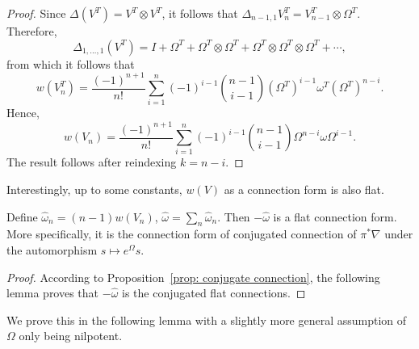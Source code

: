 \begin{proof}
Since $\Delta(V^T)=V^T\otimes V^T$, it follows that $\Delta_{n-1,1} V_n^T=V_{n-1}^T\otimes \Omega^T$. Therefore,
\begin{equation}
    \Delta_{1,\dots,1}(V^T)=I+\Omega^T+\Omega^T\otimes\Omega^T+\Omega^T\otimes\Omega^T\otimes\Omega^T+\cdots,
\end{equation}
from which it follows that
\begin{equation}\label{eq: w(v^T)}
w(V_n^T)=\frac{(-1)^{n+1}}{n!}\sum_{i=1}^n(-1)^{i-1}\binom{n-1}{i-1}(\Omega^T)^{i-1}\omega^T(\Omega^T)^{n-i}.
\end{equation}
Hence,
\begin{equation}
    w(V_n)=\frac{(-1)^{n+1}}{n!}\sum_{i=1}^n(-1)^{i-1}\binom{n-1}{i-1}\Omega^{n-i}\omega\Omega^{i-1}.
\end{equation}
The result follows after reindexing $k=n-i$.
\end{proof}

Interestingly, up to some constants, $w(V)$ as a connection form is also flat.

\begin{theorem}\label{thm: omegaHat_n = (n-1)w(V_n)}\cite[Corollary 4.17]{ZDHZ_HopfAlgebrasOfMultiplePolylogarithmsAndHolomorphicOneForms}
Define $\widehat\omega_n=(n-1)w(V_n)$, $\widehat\omega=\sum_n\widehat\omega_n$. Then $-\widehat\omega$ is a flat connection form. More specifically, it is the connection form of conjugated connection of $\pi^*\nabla$ under the automorphism $s\mapsto e^{\Omega}s$.
\end{theorem}

\begin{proof}
According to Proposition~\ref{prop: conjugate connection}, the following lemma proves that $-\widehat\omega$ is the conjugated flat connections.
\end{proof}

We prove this in the following lemma with a slightly more general assumption of $\Omega$ only being nilpotent.

